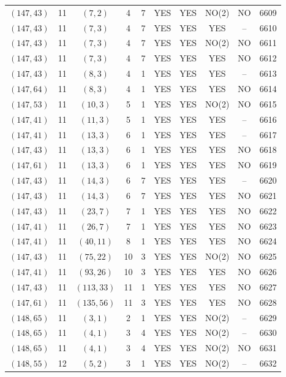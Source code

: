 \begin{longtable}{|c|c|c|c|c|c|c|c|c|c|}
$(147, 43)$ & 11 & $(7, 2)$ & 4 & 7 & YES & YES & NO(2) & NO & 6609\\
$(147, 43)$ & 11 & $(7, 3)$ & 4 & 7 & YES & YES & YES & -- & 6610\\
$(147, 43)$ & 11 & $(7, 3)$ & 4 & 7 & YES & YES & NO(2) & NO & 6611\\
$(147, 43)$ & 11 & $(7, 3)$ & 4 & 7 & YES & YES & YES & NO & 6612\\
$(147, 43)$ & 11 & $(8, 3)$ & 4 & 1 & YES & YES & YES & -- & 6613\\
$(147, 64)$ & 11 & $(8, 3)$ & 4 & 1 & YES & YES & YES & NO & 6614\\
$(147, 53)$ & 11 & $(10, 3)$ & 5 & 1 & YES & YES & NO(2) & NO & 6615\\
$(147, 41)$ & 11 & $(11, 3)$ & 5 & 1 & YES & YES & YES & -- & 6616\\
$(147, 41)$ & 11 & $(13, 3)$ & 6 & 1 & YES & YES & YES & -- & 6617\\
$(147, 43)$ & 11 & $(13, 3)$ & 6 & 1 & YES & YES & YES & NO & 6618\\
$(147, 61)$ & 11 & $(13, 3)$ & 6 & 1 & YES & YES & YES & NO & 6619\\
$(147, 43)$ & 11 & $(14, 3)$ & 6 & 7 & YES & YES & YES & -- & 6620\\
$(147, 43)$ & 11 & $(14, 3)$ & 6 & 7 & YES & YES & YES & NO & 6621\\
$(147, 43)$ & 11 & $(23, 7)$ & 7 & 1 & YES & YES & YES & NO & 6622\\
$(147, 41)$ & 11 & $(26, 7)$ & 7 & 1 & YES & YES & YES & NO & 6623\\
$(147, 41)$ & 11 & $(40, 11)$ & 8 & 1 & YES & YES & YES & NO & 6624\\
$(147, 43)$ & 11 & $(75, 22)$ & 10 & 3 & YES & YES & NO(2) & NO & 6625\\
$(147, 41)$ & 11 & $(93, 26)$ & 10 & 3 & YES & YES & YES & NO & 6626\\
$(147, 43)$ & 11 & $(113, 33)$ & 11 & 1 & YES & YES & YES & NO & 6627\\
$(147, 61)$ & 11 & $(135, 56)$ & 11 & 3 & YES & YES & YES & NO & 6628\\
$(148, 65)$ & 11 & $(3, 1)$ & 2 & 1 & YES & YES & NO(2) & -- & 6629\\
$(148, 65)$ & 11 & $(4, 1)$ & 3 & 4 & YES & YES & NO(2) & -- & 6630\\
$(148, 65)$ & 11 & $(4, 1)$ & 3 & 4 & YES & YES & NO(2) & NO & 6631\\
$(148, 55)$ & 12 & $(5, 2)$ & 3 & 1 & YES & YES & NO(2) & -- & 6632\\

\end{longtable}

